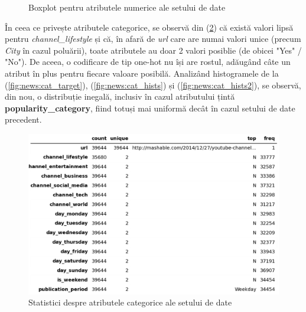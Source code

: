 \documentclass{article}
\begin{document}
\begin{figure}[htb]
    \caption{Boxplot pentru atributele numerice ale setului de date}
    \label{fig:news:num_boxplot}
\end{figure}

În ceea ce privește atributele categorice, se observă din (\ref{fig:news:cat_attr}) că
există valori lipsă pentru \textit{channel\_lifestyle} și că, în afară de 
\textit{url} care are numai valori unice (precum \textit{City} în cazul 
poluării), toate atributele au doar 2 valori posiblie (de obicei "Yes" / "No").
De aceea, o codificare de tip one-hot nu își are rostul, adăugând câte un 
atribut în plus pentru fiecare valoare posibilă. Analizând histogramele de la 
(\ref{fig:news:cat_target}), (\ref{fig:news:cat_hists}) și 
(\ref{fig:news:cat_hists2}), se observă, din nou, o distribuție inegală, 
inclusiv în cazul atributului țintă \textbf{popularity\_category}, fiind totuși
mai uniformă decât în cazul setului de date precedent.  

\begin{figure}[htb]
    \centering
    \includegraphics[scale=0.5]{news_popularity/analysis/categorical/table.png}
    \caption{Statistici despre atributele categorice ale setului de date}
    \label{fig:news:cat_attr}
\end{figure}
\end{document}

